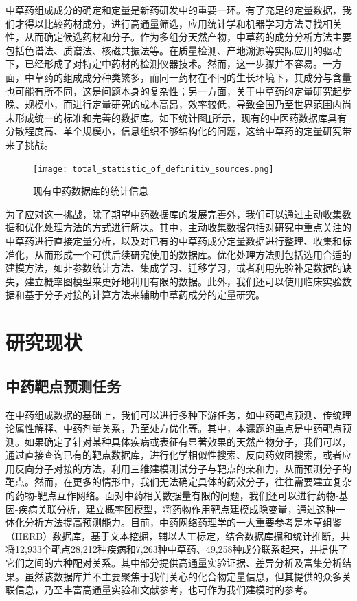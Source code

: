 中草药组成成分的确定和定量是新药研发中的重要一环。有了充足的定量数据，我们才得以比较药材成分，进行高通量筛选，应用统计学和机器学习方法寻找相关性，从而确定候选药材和分子。作为多组分天然产物，中草药的成分分析方法主要包括色谱法、质谱法、核磁共振法等\cite{中药有效部位及成分提取工艺和检测方法_2007}。在质量检测、产地溯源等实际应用的驱动下，已经形成了对特定中药材的检测仪器技术。然而，这一步骤并不容易。一方面，中草药的组成成分种类繁多，而同一药材在不同的生长环境下，其成分与含量也可能有所不同，这是问题本身的复杂性；另一方面，关于中草药的定量研究起步晚、规模小，而进行定量研究的成本高昂，效率较低，导致全国乃至世界范围内尚未形成统一的标准和完善的数据库。如下统计图\ref{fig:statistics}所示，现有的中医药数据库具有分散程度高、单个规模小，信息组织不够结构化的问题，这给中草药的定量研究带来了挑战\cite{Yang_Zhu_Yao_Chen_Chen_Gu_Jiang_Chen_Zhang_Wu_et_al._2023}。

\begin{figure}[H]
  \centering
  \texttt{[image: total\_statistic\_of\_definitiv\_sources.png]}
  \caption{现有中药数据库的统计信息}
  \label{fig:statistics}
\end{figure}


为了应对这一挑战，除了期望中药数据库的发展完善外，我们可以通过主动收集数据和优化处理方法的方式进行解决。其中，主动收集数据包括对研究中重点关注的中草药进行直接定量分析，以及对已有的中草药成分定量数据进行整理、收集和标准化，从而形成一个可供后续研究使用的数据库。优化处理方法则包括选用合适的建模方法，如非参数统计方法、集成学习、迁移学习，或者利用先验补足数据的缺失，建立概率图模型来更好地利用有限的数据。此外，我们还可以使用临床实验数据和基于分子对接的计算方法来辅助中草药成分的定量研究。

\section{研究现状}

\subsection{中药靶点预测任务}

在中药组成数据的基础上，我们可以进行多种下游任务，如中药靶点预测、传统理论属性解释、中药剂量关系，乃至处方优化等。其中，本课题的重点是中药靶点预测。如果确定了针对某种具体疾病或表征有显著效果的天然产物分子，我们可以，通过直接查询已有的靶点数据库，进行化学相似性搜索、反向药效团搜索，或者应用反向分子对接的方法，利用三维建模测试分子与靶点的亲和力，从而预测分子的靶点。\cite{Huang_Zhang_Zhou_Lin_Chen_Lin_Mai_Huang_2018}然而，在更多的情形中，我们无法确定具体的药效分子，往往需要建立复杂的药物-靶点互作网络。面对中药相关数据量有限的问题，我们还可以进行药物-基因-疾病关联分析，建立概率图模型，将药物作用靶点建模成隐变量，通过这种一体化分析方法提高预测能力。目前，中药网络药理学的一大重要参考是本草组鉴（HERB）数据库，基于文本挖掘，辅以人工标定，结合数据库掘和统计推断，共将12,933个靶点28,212种疾病和7,263种中草药、49,258种成分联系起来，并提供了它们之间的六种配对关系。其中部分提供高通量实验证据、差异分析及富集分析结果\cite{Fang_Dong_Liu_Guo_Zhao_Zhang_Bu_Liu_Huo_Cao_et_al._2021}。虽然该数据库并不主要聚焦于我们关心的化合物定量信息，但其提供的众多关联信息，乃至丰富高通量实验和文献参考，也可作为我们建模时的参考。

